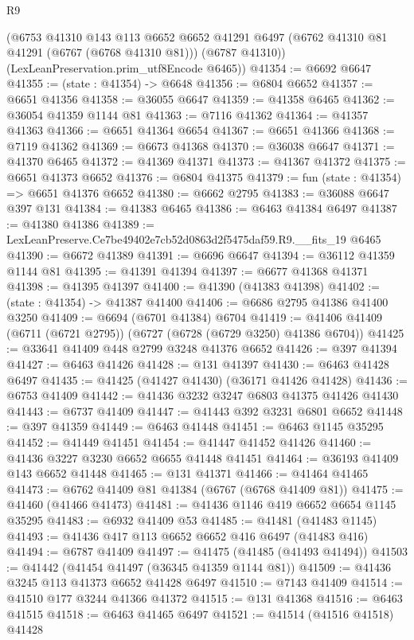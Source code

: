 \begin{lexlean}{R9}
\begin{coremodule}
      (@6753
        @41310
        @143
        @113
        @6652
        @6652
        @41291
        @6497
        (@6762 @41310 @81 @41291 (@6767 (@6768 @41310 @81)))
        (@6787 @41310))
      (LexLeanPreservation.prim_utf8Encode @6465))
@41354 := @6692 @6647
@41355 := (state : @41354) -> @6648
@41356 := @6804 @6652
@41357 := @6651 @41356
@41358 := @36055 @6647
@41359 := @41358 @6465
@41362 := @36054 @41359 @1144 @81
@41363 := @7116 @41362
@41364 := @41357 @41363
@41366 := @6651 @41364 @6654
@41367 := @6651 @41366
@41368 := @7119 @41362
@41369 := @6673 @41368
@41370 := @36038 @6647
@41371 := @41370 @6465
@41372 := @41369 @41371
@41373 := @41367 @41372
@41375 := @6651 @41373 @6652
@41376 := @6804 @41375
@41379 := fun (state : @41354) => @6651 @41376 @6652
@41380 := @6662 @2795
@41383 := @36088 @6647 @397 @131
@41384 := @41383 @6465
@41386 := @6463 @41384 @6497
@41387 := @41380 @41386
@41389 := LexLeanPreserve.Ce7be49402e7cb52d0863d2f5475daf59.R9.__fits_19 @6465
@41390 := @6672 @41389
@41391 := @6696 @6647
@41394 := @36112 @41359 @1144 @81
@41395 := @41391 @41394
@41397 := @6677 @41368 @41371
@41398 := @41395 @41397
@41400 := @41390 (@41383 @41398)
@41402 := (state : @41354) -> @41387 @41400
@41406 := @6686 @2795 @41386 @41400 @3250
@41409 := @6694 (@6701 @41384) @6704
@41419 := @41406 @41409 (@6711 (@6721 @2795)) (@6727 (@6728 (@6729 @3250) @41386 @6704))
@41425 := @33641 @41409 @448 @2799 @3248 @41376 @6652
@41426 := @397 @41394
@41427 := @6463 @41426
@41428 := @131 @41397
@41430 := @6463 @41428 @6497
@41435 := @41425 (@41427 @41430) (@36171 @41426 @41428)
@41436 := @6753 @41409
@41442 := @41436 @3232 @3247 @6803 @41375 @41426 @41430
@41443 := @6737 @41409
@41447 := @41443 @392 @3231 @6801 @6652
@41448 := @397 @41359
@41449 := @6463 @41448
@41451 := @6463 @1145 @35295
@41452 := @41449 @41451
@41454 := @41447 @41452 @41426
@41460 := @41436 @3227 @3230 @6652 @6655 @41448 @41451
@41464 := @36193 @41409 @143 @6652 @41448
@41465 := @131 @41371
@41466 := @41464 @41465
@41473 := @6762 @41409 @81 @41384 (@6767 (@6768 @41409 @81))
@41475 := @41460 (@41466 @41473)
@41481 := @41436 @1146 @419 @6652 @6654 @1145 @35295
@41483 := @6932 @41409 @53
@41485 := @41481 (@41483 @1145)
@41493 := @41436 @417 @113 @6652 @6652 @416 @6497 (@41483 @416)
@41494 := @6787 @41409
@41497 := @41475 (@41485 (@41493 @41494))
@41503 := @41442 (@41454 @41497 (@36345 @41359 @1144 @81))
@41509 := @41436 @3245 @113 @41373 @6652 @41428 @6497
@41510 := @7143 @41409
@41514 := @41510 @177 @3244 @41366 @41372
@41515 := @131 @41368
@41516 := @6463 @41515
@41518 := @6463 @41465 @6497
@41521 := @41514 (@41516 @41518) @41428

\end{coremodule}
\end{lexlean}
